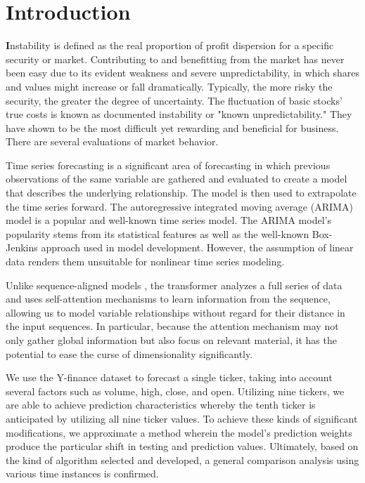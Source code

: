 \chapter{Introduction}
\label{ch:into} %

\textbf 

Instability is defined as the real proportion of profit dispersion for a specific security or market. Contributing to and benefitting from the market has never been easy due to its evident weakness and severe unpredictability, in which shares and values might increase or fall dramatically. Typically, the more risky the security, the greater the degree of uncertainty. The fluctuation of basic stocks' true costs is known as documented instability or "known unpredictability." They have shown to be the most difficult yet rewarding and beneficial for business. There are several evaluations of market behavior.

Time series forecasting is a significant area of forecasting in which previous observations of the same variable are gathered and evaluated to create a model that describes the underlying relationship. The model is then used to extrapolate the time series forward. The autoregressive integrated moving average (ARIMA) model is a popular and well-known time series model. The ARIMA model's popularity stems from its statistical features as well as the well-known Box-Jenkins approach \citep{DEGROOT1991177} used in model development. However, the assumption of linear data renders them unsuitable for nonlinear time series modeling.

Unlike sequence-aligned models \citep{wu2020deep}, the transformer analyzes a full series of data and uses self-attention mechanisms to learn information from the sequence, allowing us to model variable relationships without regard for their distance in the input sequences. In particular, because the attention mechanism may not only gather global information but also focus on relevant material, it has the potential to ease the curse of dimensionality significantly.


We use the Y-finance dataset to forecast a single ticker, taking into account several factors 
such as volume, high, close, and open. Utilizing nine tickers, we are able to achieve 
prediction characteristics whereby the tenth ticker is anticipated by utilizing all nine ticker 
values. To achieve these kinds of significant modifications, we approximate a method wherein 
the model's prediction weights produce the particular shift in testing and prediction values. 
Ultimately, based on the kind of algorithm selected and developed, a general comparison 
analysis using various time instances is confirmed. 

